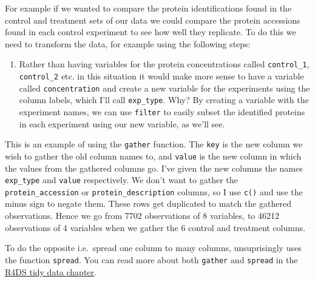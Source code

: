 \documentclass[12pt,]{book}
\newenvironment{Shaded}{\begin{snugshade}}{\end{snugshade}}
\newcommand{\CommentTok}[1]{\textcolor[rgb]{0.56,0.35,0.01}{\textit{#1}}}
\newcommand{\DataTypeTok}[1]{\textcolor[rgb]{0.13,0.29,0.53}{#1}}
\newcommand{\KeywordTok}[1]{\textcolor[rgb]{0.13,0.29,0.53}{\textbf{#1}}}
\newcommand{\NormalTok}[1]{#1}
\newcommand{\OperatorTok}[1]{\textcolor[rgb]{0.81,0.36,0.00}{\textbf{#1}}}
\newcommand{\StringTok}[1]{\textcolor[rgb]{0.31,0.60,0.02}{#1}}
\providecommand{\tightlist}{%
  \setlength{\itemsep}{0pt}\setlength{\parskip}{0pt}}
\begin{document}
For example if we wanted to compare the protein identifications found in the
control and treatment sets of our data we could compare the protein accessions
found in each control experiment to see how well they replicate.
To do this we need to transform the data, for example using the following steps:

\begin{enumerate}
\def\labelenumi{\arabic{enumi}.}
\tightlist
\item
  Rather than having variables for the protein concentrations called \texttt{control\_1},
  \texttt{control\_2} etc. in this situation it would make more sense to have a variable
  called \texttt{concentration} and create a new variable for the experiments using the
  column labels, which I'll call \texttt{exp\_type}. Why? By creating a variable with
  the experiment names, we can use \texttt{filter} to easily subset the identified
  proteins in each experiment using our new variable, as we'll see.
\end{enumerate}

This is an example of using the
\texttt{gather} function. The \texttt{key} is the new column we wish to gather the old
column names to, and \texttt{value} is the new column in which the values from the
gathered columns go. I've given the new columns the names \texttt{exp\_type} and \texttt{value}
respectively. We don't want to gather the \texttt{protein\_accession} or
\texttt{protein\_description} columns, so I use \texttt{c()} and use the minus sign to negate
them. These rows get duplicated to match the gathered observations. Hence we
go from 7702 observations of 8 variables, to 46212 observations of 4 variables
when we gather the 6 control and treatment columns.

To do the opposite i.e.~spread one column to many columns, unsuprisingly uses
the function \texttt{spread}. You can read more about both \texttt{gather} and \texttt{spread} in
the \href{http://r4ds.had.co.nz/tidy-data.html\#spreading-and-gathering}{R4DS tidy data chapter}.

\begin{Shaded}
\end{Shaded}
\end{document}
